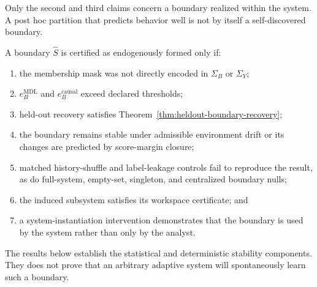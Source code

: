 Only the second and third claims concern a boundary realized within the
system. A post hoc partition that predicts behavior well is not by itself a
self-discovered boundary.


A boundary \(\widehat S\) is certified as endogenously formed only if:
\begin{enumerate}
\item the membership mask was not directly encoded in \(\Sigma_B\) or
 \(\Sigma_Y\);
\item \(e_B^{\mathrm{MDL}}\) and \(e_B^{\mathrm{causal}}\) exceed declared
 thresholds;
\item held-out recovery satisfies Theorem~\ref{thm:heldout-boundary-recovery};
\item the boundary remains stable under admissible environment drift or its
 changes are predicted by score-margin closure;
\item matched history-shuffle and label-leakage controls fail to reproduce
 the result, as do full-system, empty-set, singleton, and centralized
 boundary nulls;
\item the induced subsystem satisfies its workspace certificate; and
\item a system-instantiation intervention demonstrates that the boundary is
 used by the system rather than only by the analyst.
\end{enumerate}

The results below establish the statistical and deterministic stability components. They
does not prove that an arbitrary adaptive system will spontaneously learn such
a boundary.
